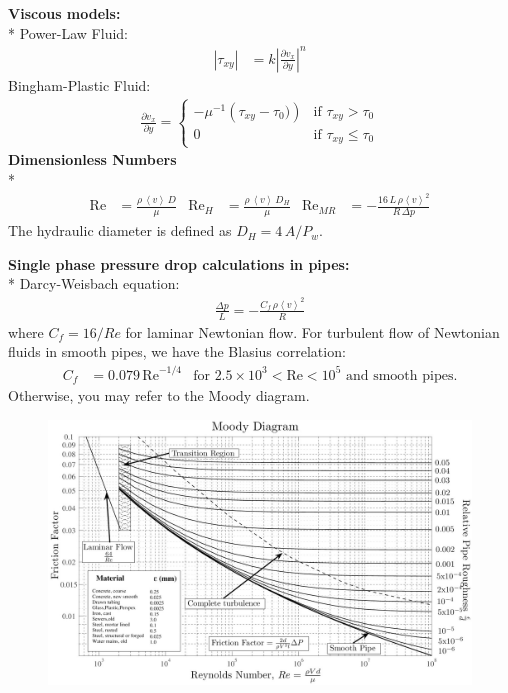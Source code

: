\begin{datasheet}
\newpage
{\bf Viscous models:}\\*
Power-Law Fluid:
\begin{align}\label{eq:powerlawfluid}
  \left|\tau_{xy}\right| &= k \left|\frac{\partial v_x}{\partial y}\right|^{n}
\end{align}
Bingham-Plastic Fluid:
\begin{align*}
  \frac{\partial v_x}{\partial y} = \begin{cases}
    -\mu^{-1}\left(\tau_{xy}-\tau_0)\right) & \text{if
      $\tau_{xy} > \tau_0$}
    \\
    0 & \text{if $\tau_{xy} \leq \tau_0$}
  \end{cases}
\end{align*}
{\bf Dimensionless Numbers}\\*
\begin{align}
  \text{Re}&=\frac{\rho\,\left\langle v\right\rangle\,D}{\mu}
  &
  \text{Re}_{H}&=\frac{\rho\,\left\langle v\right\rangle\,D_H}{\mu}
  &
  \text{Re}_{MR}&=-\frac{16\,L\,\rho\left\langle
      v\right\rangle^2}{R\,\Delta p}\label{eq:Reynolds}
\end{align}
The hydraulic diameter is defined as $D_H=4\,A / P_w$.

{\bf Single phase pressure drop calculations in pipes:}\\*
Darcy-Weisbach equation:
\begin{align}
  \frac{\Delta p}{L} = -\frac{C_f\,\rho\left\langle v\right\rangle^2}{R}
\end{align}
where $C_f=16/Re$ for laminar Newtonian flow.  For turbulent flow of
Newtonian fluids in smooth pipes, we have the Blasius correlation:
\begin{align*}
  C_f&=0.079\,\text{Re}^{-1/4} & \text{for $2.5\times10^3<\text{Re}<10^5$ and smooth pipes.}
\end{align*}
Otherwise, you may refer to the Moody diagram.
\begin{figure}[h]
  \includegraphics[clip,width=\linewidth]{figures/Moody_diagram}
\end{figure}


\end{datasheet}
